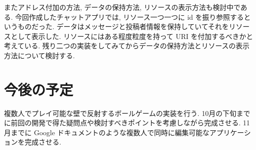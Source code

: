 \documentclass[a4j, 10pt, twocolumn]{ujarticle}
\begin{document}
    またアドレス付加の方法, データの保持方法, リソースの表示方法も検討中である. 今回作成したチャットアプリでは, リソース一つ一つに id を振り参照するというものだった. データはメッセージと投稿者情報を保持していてそれをリソースとして表示した. リソースにはある程度粒度を持って URI を付加するべきかと考えている. 残り二つの実装をしてみてからデータの保持方法とリソースの表示方法について検討する.  
    
    \section{今後の予定}
    複数人でプレイ可能な壁で反射するボールゲームの実装を行う. 10月の下旬までに前回の開発で得た疑問点や検討すべきポイントを考慮しながら完成させる.  
    11月までに Google ドキュメントのような複数人で同時に編集可能なアプリケーションを完成させる.  
    
    
    
  
\end{document}
